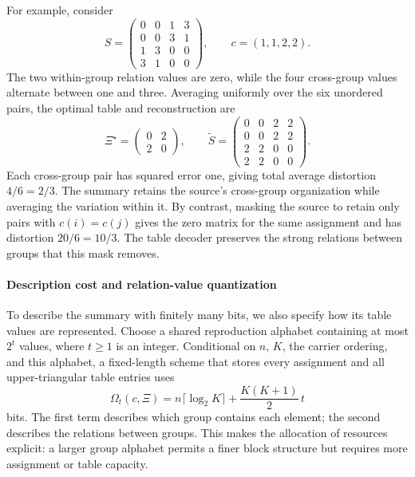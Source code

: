 For example, consider
\begin{equation}
S=\begin{pmatrix}
0&0&1&3\\
0&0&3&1\\
1&3&0&0\\
3&1&0&0
\end{pmatrix},
\qquad
c=(1,1,2,2).
\label{eq:block-toy-source}
\end{equation}
The two within-group relation values are zero, while the four cross-group values alternate between one and three.
Averaging uniformly over the six unordered pairs, the optimal table and reconstruction are
\begin{equation}
\Xi^\star=\begin{pmatrix}0&2\\2&0\end{pmatrix},
\qquad
\widetilde S=\begin{pmatrix}
0&0&2&2\\
0&0&2&2\\
2&2&0&0\\
2&2&0&0
\end{pmatrix}.
\label{eq:block-toy-reconstruction}
\end{equation}
Each cross-group pair has squared error one, giving total average distortion $4/6=2/3$.
The summary retains the source's cross-group organization while averaging the variation within it.
By contrast, masking the source to retain only pairs with $c(i)=c(j)$ gives the zero matrix for the same assignment and has distortion $20/6=10/3$.
The table decoder preserves the strong relations between groups that this mask removes.

\paragraph{Description cost and relation-value quantization}
To describe the summary with finitely many bits, we also specify how its table values are represented.
Choose a shared reproduction alphabet containing at most $2^t$ values, where $t\ge1$ is an integer.
Conditional on $n$, $K$, the carrier ordering, and this alphabet, a fixed-length scheme that stores every assignment and all upper-triangular table entries uses
\begin{equation}
\Omega_t(c,\Xi)
=n\lceil\log_2K\rceil+\frac{K(K+1)}{2}\,t
\label{eq:block-description-cost}
\end{equation}
bits.
The first term describes which group contains each element; the second describes the relations between groups.
This makes the allocation of resources explicit: a larger group alphabet permits a finer block structure but requires more assignment or table capacity.

